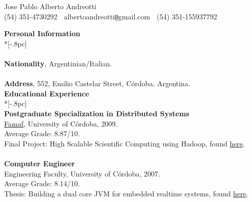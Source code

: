 \documentclass[letter,11pt,english]{article}
\begin{document}
\pagestyle{headings}
\setcounter{page}{1}

\begin{center}
{\Large Jose Pablo Alberto Andreotti} \\[.5pc]
(54) 351-4730292 $\;$ albertoandreotti\verb|@|gmail.com $\;$ (54) 351-155937792 \\[3pc]
\end{center}
{\large \bf Personal Information} \\*[-.8pc]
\underline{\hspace{6in}} \\
\\
{\bf Nationality}, Argentinian/Italian.\\
\\
{\bf Address}, 552, Emilio Castelar Street, C\'ordoba. Argentina.\\

{\large \bf Educational Experience} \\*[-.8pc]
\underline{\hspace{6in}} \\
{\bf Postgraduate Specialization in Distributed Systems}\\
\href{http://www.famaf.unc.edu.ar/}{Famaf}, University of C\'ordoba, 2009. \\
Average Grade: 8.87/10. \\
Final Project: High Scalable Scientific Computing using Hadoop, found \href{https://docs.google.com/viewer?a=v&pid=explorer&chrome=true&srcid=0B5AOpwg8IzVANjJlODZhZDctNWUzMS00MmNhLWI3OWMtMWNhMTdjODQwNjVl&hl=en}{here}.\\
\\
{\bf Computer Engineer}\\
Engineering Faculty, University of C\'ordoba, 2007.\\
Average Grade: 8.14/10. \\
Thesis: Building a dual core JVM for embedded realtime systems, found \href{https://docs.google.com/viewer?a=v&pid=explorer&chrome=true&srcid=1gdJXYgQtLDHDOxGDtbKzdmAl1LmNx-yo4w6vNl-K_Z-1YocLhtJxMvoqGvd1&hl=en}{here}.\\
\end{document}
